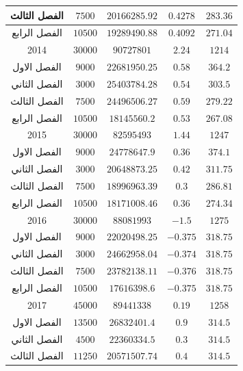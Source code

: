 \documentclass[10pt,a4paper]{report}
\begin{document}
\begin{longtable}{|c|c|c|c|c|}
	الفصل الثالث & $7500$               & $20166285.92$ & $0.4278$    & $283.36$  \\ \hline
	الفصل الرابع & $10500$              & $19289490.88$ & $0.4092$    & $271.04$  \\ \hline
	2014         & $30000$              & $90727801$    & $2.24$      & $1214$    \\ \hline
	الفصل الاول  & $9000$               & $22681950.25$ & $0.58$      & $364.2$   \\ \hline
	الفصل الثاني & $3000$               & $25403784.28$ & $0.54$      & $303.5$   \\ \hline
	الفصل الثالث & $7500$               & $24496506.27$ & $0.59$      & $279.22$  \\ \hline
	الفصل الرابع & $10500$              & $18145560.2$  & $0.53$      & $267.08$  \\ \hline
	2015         & $30000$              & $82595493$    & $1.44$      & $1247$    \\ \hline
	الفصل الاول  & $9000$               & $24778647.9$  & $0.36$      & $374.1$   \\ \hline
	الفصل الثاني & $3000$               & $20648873.25$ & $0.42$      & $311.75$  \\ \hline
	الفصل الثالث & $7500$               & $18996963.39$ & $0.3$       & $286.81$  \\ \hline
	الفصل الرابع & $10500$              & $18171008.46$ & $0.36$      & $274.34$  \\ \hline
	2016         & $30000$              & $88081993$    & $-1.5$      & $1275$    \\ \hline
	الفصل الاول  & $9000$               & $22020498.25$ & $-0.375$    & $318.75$  \\ \hline
	الفصل الثاني & $3000$               & $24662958.04$ & $-0.374$    & $318.75$  \\ \hline
	الفصل الثالث & $7500$               & $23782138.11$ & $-0.376$    & $318.75$  \\ \hline
	الفصل الرابع & $10500$              & $17616398.6$  & $-0.375$    & $318.75$  \\ \hline
	2017         & $45000$              & $89441338$    & $0.19$      & $1258$    \\ \hline
	الفصل الاول  & $13500$              & $26832401.4$  & $0.9$       & $314.5$   \\ \hline
	الفصل الثاني & $4500$               & $22360334.5$  & $0.3$       & $314.5$   \\ \hline
	الفصل الثالث & $11250$              & $20571507.74$ & $0.4$       & $314.5$   \\ \hline

\end{longtable}
\end{document}

